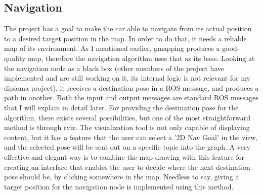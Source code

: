 \subsection{Navigation}
The project has a goal to make the car able to navigate from its actual position to a desired target position in the map. In order to do that, it needs a reliable map of its environment. As I mentioned earlier, gmapping produces a good-quality map, therefore the navigation algorithm uses that as its base. Looking at the navigation node as a black box (other members of the project have implemented and are still working on it, its internal logic is not relevant for my diploma project), it receives a destination pose in a ROS message, and produces a path in another. Both the input and output messages are standard ROS messages that I will explain in detail later. For providing the destination pose for the algorithm, there exists several possibilities, but one of the most straightforward method is through rviz. The visualization tool is not only capable of displaying content, but it has a feature that the user can select a '2D Nav Goal' in the view, and the selected pose will be sent out on a specific topic into the graph. A very effective and elegant way is to combine the map drawing with this feature for creating an interface that enables the user to decide where the next destination pose should be, by clicking somewhere in the map. Needless to say, giving a target position for the navigation node is implemented using this method.


